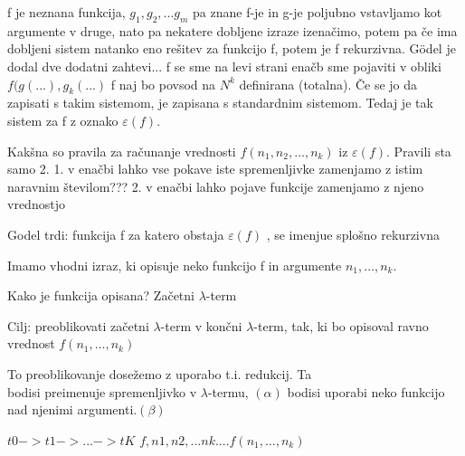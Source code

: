 \documentclass[10pt,a4paper,oneside]{book}
\begin{document}
f je neznana funkcija, $g_1, g_2, \dots g_m$ pa znane %
f-je in g-je poljubno vstavljamo kot argumente v druge, nato pa nekatere dobljene izraze izenačimo, potem pa če ima dobljeni sistem natanko eno rešitev za funkcijo f, potem je f rekurzivna.%
Gödel je dodal dve dodatni zahtevi... f se sme na levi strani enačb sme pojaviti v obliki $f(g(...), g_k(...)$ %
f naj bo povsod na $N^k$ definirana (totalna).
Če se jo da zapisati s takim sistemom, je zapisana s standardnim sistemom. Tedaj je tak sistem za f z oznako $\varepsilon(f)$.

Kakšna so pravila za računanje vrednosti $f(n_1, n_2, \dots, n_k)$ iz $\varepsilon(f)$. %
Pravili sta samo 2.
1. v enačbi lahko vse pokave iste spremenljivke zamenjamo z istim naravnim številom???
2. v enačbi lahko pojave funkcije zamenjamo z njeno vrednostjo

Godel trdi: funkcija f za katero obstaja $\varepsilon(f)$ , se imenjue splošno rekurzivna%


Imamo vhodni izraz, ki opisuje neko funkcijo f in argumente $n_1, \dots, n_k$.

Kako je funkcija opisana?
Začetni $\lambda$-term

Cilj: preoblikovati začetni $\lambda$-term v končni $\lambda$-term, tak, ki bo opisoval ravno vrednost $f(n_1, \dots, n_k)$

To preoblikovanje dosežemo z uporabo t.i. redukcij. Ta\\
bodisi preimenuje spremenljivko v $\lambda$-termu, $(\alpha)$
bodisi uporabi neko funkcijo nad njenimi argumenti.$(\beta)$ %

$t0->t1->...->tK$
$f, n1, n2, ... nk$....$f(n_1, \dots, n_k)$

\end{document}
